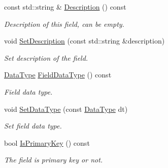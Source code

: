 \begin{DoxyCompactItemize}
\mbox{\label{classmilvus_1_1_field_schema_ae3be1be55cf303c618b09382b181dc9c}} 
const std\+::string \& \hyperlink{classmilvus_1_1_field_schema_ae3be1be55cf303c618b09382b181dc9c}{Description} () const
\begin{DoxyCompactList}\small\item\em Description of this field, can be empty. \end{DoxyCompactList}\item 
\mbox{\label{classmilvus_1_1_field_schema_ae12d825b5d1e914801efb02d399bb8e7}} 
void \hyperlink{classmilvus_1_1_field_schema_ae12d825b5d1e914801efb02d399bb8e7}{Set\+Description} (const std\+::string \&description)
\begin{DoxyCompactList}\small\item\em Set description of the field. \end{DoxyCompactList}\item 
\mbox{\label{classmilvus_1_1_field_schema_a7fdfe0d44e25b598b491f9529d170227}} 
\hyperlink{namespacemilvus_a3bdf02cc09dcb59a1e1d2f287d90788b}{Data\+Type} \hyperlink{classmilvus_1_1_field_schema_a7fdfe0d44e25b598b491f9529d170227}{Field\+Data\+Type} () const
\begin{DoxyCompactList}\small\item\em Field data type. \end{DoxyCompactList}\item 
\mbox{\label{classmilvus_1_1_field_schema_a9e308a0e98b447381db2747bb9e28fbd}} 
void \hyperlink{classmilvus_1_1_field_schema_a9e308a0e98b447381db2747bb9e28fbd}{Set\+Data\+Type} (const \hyperlink{namespacemilvus_a3bdf02cc09dcb59a1e1d2f287d90788b}{Data\+Type} dt)
\begin{DoxyCompactList}\small\item\em Set field data type. \end{DoxyCompactList}\item 
bool \hyperlink{classmilvus_1_1_field_schema_a5f0f254379db440e1acfc18b61f35fa3}{Is\+Primary\+Key} () const
\begin{DoxyCompactList}\small\item\em The field is primary key or not. \end{DoxyCompactList}\item 

\end{DoxyCompactItemize}
